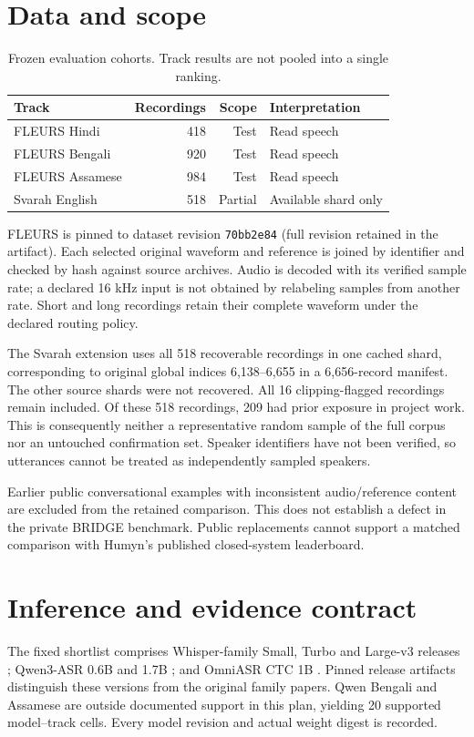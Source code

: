 \documentclass[11pt]{article}
\begin{document}
\section{Data and scope}
\begin{table}[h]
\centering
\begin{tabular}{lrrl}\toprule
Track & Recordings & Scope & Interpretation \\\midrule
FLEURS Hindi & 418 & Test & Read speech \\
FLEURS Bengali & 920 & Test & Read speech \\
FLEURS Assamese & 984 & Test & Read speech \\
Svarah English & 518 & Partial & Available shard only \\\bottomrule
\end{tabular}
\caption{Frozen evaluation cohorts. Track results are not pooled into a single ranking.}\label{tab:data}
\end{table}
FLEURS \citep{fleurs} is pinned to dataset revision \texttt{70bb2e84} (full revision retained in the artifact). Each selected original waveform and reference is joined by identifier and checked by hash against source archives. Audio is decoded with its verified sample rate; a declared 16 kHz input is not obtained by relabeling samples from another rate. Short and long recordings retain their complete waveform under the declared routing policy.

The Svarah extension \citep{svarah} uses all 518 recoverable recordings in one cached shard, corresponding to original global indices 6,138--6,655 in a 6,656-record manifest. The other source shards were not recovered. All 16 clipping-flagged recordings remain included. Of these 518 recordings, 209 had prior exposure in project work. This is consequently neither a representative random sample of the full corpus nor an untouched confirmation set. Speaker identifiers have not been verified, so utterances cannot be treated as independently sampled speakers.

Earlier public conversational examples with inconsistent audio/reference content are excluded from the retained comparison. This does not establish a defect in the private BRIDGE benchmark. Public replacements cannot support a matched comparison with Humyn's published closed-system leaderboard.

\section{Inference and evidence contract}
The fixed shortlist comprises Whisper-family Small, Turbo and Large-v3 releases \citep{whisper}; Qwen3-ASR 0.6B and 1.7B \citep{qwen}; and OmniASR CTC 1B \citep{omni}. Pinned release artifacts distinguish these versions from the original family papers. Qwen Bengali and Assamese are outside documented support in this plan, yielding 20 supported model--track cells. Every model revision and actual weight digest is recorded.
\end{document}
